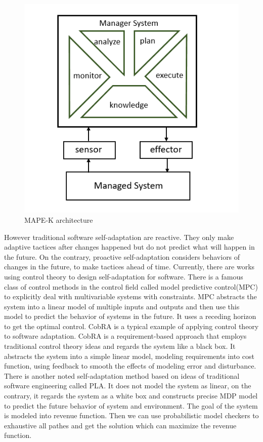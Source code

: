 \documentclass[sigconf]{acmart}
\begin{document}
\begin{figure}[h]
	\centering
	\includegraphics[width=\linewidth]{mape}
	\caption{MAPE-K architecture}
	\label{mape-k}
\end{figure}
However traditional software self-adaptation are reactive. They only make adaptive tactices after changes happened but do not predict what will happen in the future. On the contrary, proactive self-adaptation considers behaviors of changes in the future, to make tactices ahead of time.
Currently, there are works using control theory to design self-adaptation for software. There is a famous class of control methods in the control field called model predictive control(MPC)\cite{mpc} to explicitly deal with multivariable systems with constraints. MPC abstracts the system into a linear model of multiple inputs and outputs and then use this model to predict the behavior of systems in the future. It uses a receding horizon to get the optimal control.
CobRA is a typical example of applying control theory to software adaptation. CobRA is a requirement-based approach that employs traditional control theory ideas and regards the system like a black box. It abstracts the system into a simple linear model, modeling requirements into cost function, using feedback to smooth the effects of modeling error and disturbance.
There is another noted self-adaptation method based on ideas of traditional software engineering called PLA. It does not model the system as linear, on the contrary, it regards the system as a white box and constructs precise MDP model to predict the future behavior of system and environment. The goal of the system is modeled into revenue function. Then we can use probabilistic model checkers\cite{pmc} to exhaustive all pathes and get the solution which can maximize the revenue function.
\end{document}
